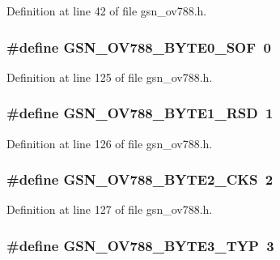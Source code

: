 Definition at line 42 of file gsn\_\-ov788.h.

\hypertarget{a00537_aaa8e2c17023f689a4163090e05fb4848}{
\subsubsection[{GSN\_\-OV788\_\-BYTE0\_\-SOF}]{\setlength{\rightskip}{0pt plus 5cm}\#define GSN\_\-OV788\_\-BYTE0\_\-SOF~0}}
\label{a00537_aaa8e2c17023f689a4163090e05fb4848}


Definition at line 125 of file gsn\_\-ov788.h.

\hypertarget{a00537_a88b389ef35586d2c4bea20e141ac2fc1}{
\subsubsection[{GSN\_\-OV788\_\-BYTE1\_\-RSD}]{\setlength{\rightskip}{0pt plus 5cm}\#define GSN\_\-OV788\_\-BYTE1\_\-RSD~1}}
\label{a00537_a88b389ef35586d2c4bea20e141ac2fc1}


Definition at line 126 of file gsn\_\-ov788.h.

\hypertarget{a00537_a0e8d18eaf1c23389ea9a7de8a0e1e613}{
\subsubsection[{GSN\_\-OV788\_\-BYTE2\_\-CKS}]{\setlength{\rightskip}{0pt plus 5cm}\#define GSN\_\-OV788\_\-BYTE2\_\-CKS~2}}
\label{a00537_a0e8d18eaf1c23389ea9a7de8a0e1e613}


Definition at line 127 of file gsn\_\-ov788.h.

\hypertarget{a00537_acbed1be004ffad78affe265811ea03ce}{
\subsubsection[{GSN\_\-OV788\_\-BYTE3\_\-TYP}]{\setlength{\rightskip}{0pt plus 5cm}\#define GSN\_\-OV788\_\-BYTE3\_\-TYP~3}}
\label{a00537_acbed1be004ffad78affe265811ea03ce}


